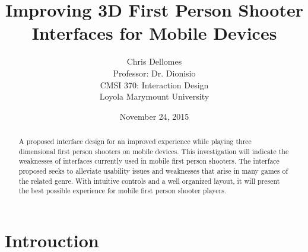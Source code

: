 \documentclass{article}
\begin{document}
\title{Improving 3D First Person Shooter Interfaces for Mobile Devices}
\author{Chris Dellomes\\
Professor: Dr. Dionisio\\
CMSI 370: Interaction Design\\
	Loyola Marymount University}

\date{November 24, 2015}

\maketitle

\begin{center}
\begin{abstract}
\noindent A proposed interface design for an improved experience while playing three dimensional first person shooters on mobile devices. This investigation will indicate the weaknesses of interfaces currently used in mobile first person shooters. The interface proposed seeks to alleviate usability issues and weaknesses that arise in many games of the related genre. With intuitive controls and a well organized layout, it will present the best possible experience for mobile first person shooter players.
\end{abstract}
\end{center}

\thispagestyle{empty}

\clearpage

\setcounter{page}{1}

\section{Introuction}
\end{document}
